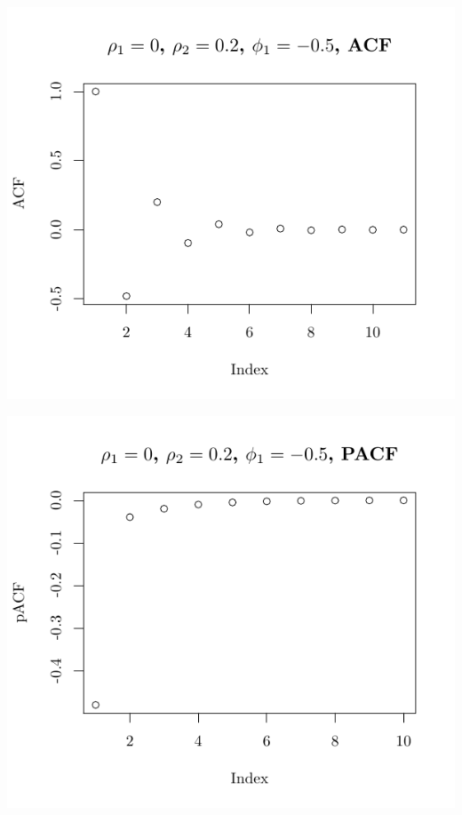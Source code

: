 \documentclass[10pt]{paper}\usepackage[]{graphicx}\usepackage[]{color}
\makeatletter
\def\maxwidth{ %
  \ifdim\Gin@nat@width>\linewidth
    \linewidth
  \else
    \Gin@nat@width
  \fi
}
\newenvironment{knitrout}{}{} %
\makeatother
\begin{document}
\begin{knitrout}
{\centering \includegraphics[width=\maxwidth]{figure/graphics-plotter-61} 

}




{\centering \includegraphics[width=\maxwidth]{figure/graphics-plotter-62} 

}





\end{knitrout}
\end{document}

